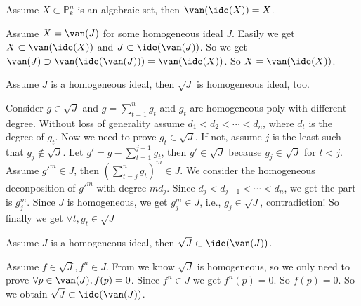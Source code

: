 \documentclass{ctexart}
\begin{document}
\begin{problem}
  Assume \(X \subset \mathbb{P}_k^n\) is an algebraic set, then \(\van(\ide(X))=X\). 
\end{problem}

\begin{solution}
  Assume \(X=\van(J)\) for some homogeneous ideal \(J\). 
  Easily we get \(X \subset \van(\ide(X))\) and \(J \subset \ide(\van(J))\). 
  So we get \(\van(J) \supset \van(\ide(\van(J)))=\van(\ide(X))\). 
  So \(X=\van(\ide(X))\). 
\end{solution}

\begin{problem}
  Assume \(J\) is a homogeneous ideal, then \(\sqrt{J}\) is homogeneous ideal, too. 
\end{problem}

\begin{solution}
  Consider \(g \in \sqrt{J}\) and \(g=\sum_{t=1}^{n} g_t\) and \(g_t\) are homogeneous poly with different degree. 
  Without loss of generality assume \(d_1<d_2<\cdots<d_n\), where \(d_t\) is the degree of \(g_t\). 
  Now we need to prove \(g_t \in \sqrt{J}\). If not, assume \(j\) is the least such that \(g_j \notin \sqrt{J}\). 
  Let \(g'=g-\sum_{t=1}^{j-1} g_t\), then \(g' \in \sqrt{J}\) because \(g_j \in \sqrt{J}\) for \(t<j\). 
  Assume \(g'^{m}\in J\), then \((\sum_{t=j}^{n} g_t)^{m} \in J\). 
  We consider the homogeneous deconposition of \(g'^{m}\) with degree \(m d_j\).
  Since \(d_j<d_{j+1}<\cdots<d_n\), we get the part is \(g_j^{m}\). 
  Since \(J\) is homogeneous, we get \(g_j^{m} \in J\), i.e., \(g_j \in \sqrt{J}\), contradiction! 
  So finally we get \(\forall t, g_t \in \sqrt{J}\)
\end{solution}

\begin{problem}
  Assume \(J\) is a homogeneous ideal, then \(\sqrt{J}\subset \ide(\van(J))\). 
\end{problem}

\begin{solution}
  Assume \(f \in \sqrt{J},f^{n} \in J\). From  we know \(\sqrt{J}\) is homogeneous, 
  so we only need to prove \(\forall p \in \van(J),f(p)=0\). 
  Since \(f^n \in J\) we get \(f^n(p) =0\). So \(f(p)=0\). 
  So we obtain \(\sqrt{J}\subset \ide(\van(J))\). 
\end{solution}
\end{document}
